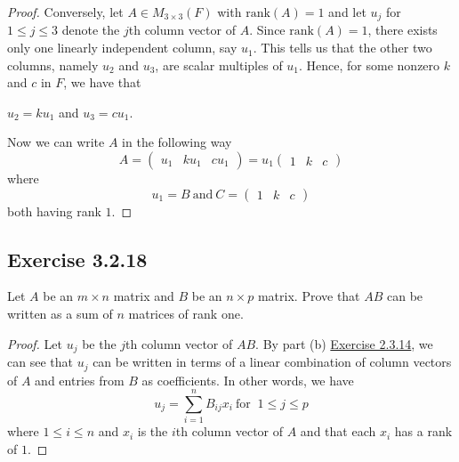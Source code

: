 \begin{proof}
                Conversely, let \( A \in {M}_{3 \times 3}(F)  \) with \( \text{rank}(A) = 1  \) and let \( {u}_{j} \) for \( 1 \leq j \leq 3  \) denote the \( j \)th column vector of \( A  \). Since \( \text{rank}(A) = 1  \), there exists only one linearly independent column, say \( {u}_{1} \). This tells us that the other two columns, namely \( {u}_{2} \) and \( {u}_{3} \), are scalar multiples of \( {u}_{1} \). Hence, for some nonzero \( k \) and \( c \) in \( F  \), we have that
                \begin{center}
                    \( {u}_{2} = k {u}_{1} \) and \( {u}_{3} = c {u}_{1}  \).
                \end{center}
                Now we can write \( A \) in the following way
                \[  A = \begin{pmatrix} 
                    {u}_{1} & {ku}_{1} & {cu}_{1}
                          \end{pmatrix} = {u}_{1} \begin{pmatrix} 
                    1 & k & c 
                                    \end{pmatrix} \]
                                    where
                    \[  {u}_{1} = B \ \text{and} \ C = \begin{pmatrix} 
                        1 & k & c 
                              \end{pmatrix} \]
                              both having rank \( 1 \).
\end{proof}

\subsection*{Exercise 3.2.18} Let \( A  \) be an \( m \times n  \) matrix and \( B  \) be an \( n \times p  \) matrix. Prove that \( AB  \) can be written as a sum of \( n  \) matrices of rank one.
\begin{proof}
Let \( {u}_{j} \) be the \( j \)th column vector of \( AB  \). By part (b) {\hyperref[Exercise 2.3.14]{Exercise 2.3.14}}, we can see that \( {u}_{j} \) can be written in terms of a linear combination of column vectors of \( A  \) and entries from \( B \) as coefficients. In other words, we have   
\[ {u}_{j} = \sum_{ i=1 }^{ n } {B}_{ij} {x}_{i} \ \text{for } \ 1 \leq j \leq p    \]
where \( 1 \leq i \leq n  \) and \( {x}_{i} \) is the \( i \)th column vector of \( A \) and that each \( {x}_{i} \) has a rank of \( 1 \). 
\end{proof}

